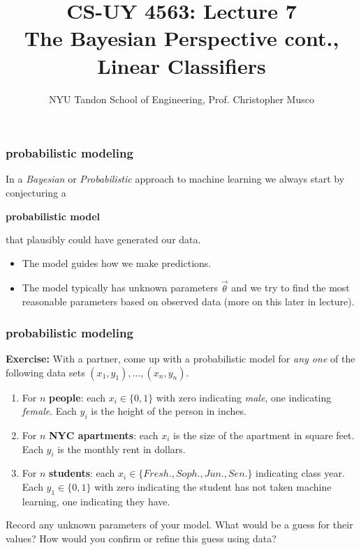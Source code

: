 \documentclass[handout,compress]{beamer}
\title{CS-UY 4563: Lecture 7 \\ The Bayesian Perspective cont., Linear Classifiers}
\author{NYU Tandon School of Engineering, Prof. Christopher Musco}
\date{}
\begin{document}
\begin{frame}
	\titlepage 
\end{frame}

\begin{frame}
	\frametitle{probabilistic modeling}
		In a \emph{Bayesian} or \emph{Probabilistic} approach to machine learning we always start by conjecturing a
		\begin{center}
			\textbf{probabilistic model}
		\end{center}
		that plausibly could have generated our data.
		
		\begin{itemize}
			\item The model guides how we make predictions.
			\item The model typically has unknown parameters $\vec{\theta}$ and we try to find the most reasonable parameters based on observed data (more on this later in lecture).
		\end{itemize}
\end{frame}

\begin{frame}
	\frametitle{probabilistic modeling}
	\textbf{Exercise:} With a partner, come up with a probabilistic model for \emph{any one} of the following data sets $(x_1, y_1), \ldots, (x_n,y_n)$.
	\begin{enumerate}
		\item For $n$ \textbf{people}: each $x_i \in \{0,1\}$ with zero indicating \emph{male}, one indicating \emph{female}. Each $y_i$ is the height of the person in inches. 
		\item For $n$ \textbf{NYC apartments}: each $x_i$ is the size of the apartment in square feet. Each $y_i$ is the monthly rent in dollars. 
		\item For $n$ \textbf{students}: each $x_i \in \{Fresh.,Soph.,Jun.,Sen.\}$ indicating class year. Each $y_1 \in \{0,1\}$ with zero indicating the student has not taken machine learning, one indicating they have.
	\end{enumerate}
	
	\vspace{-.5em}
	\begin{center}
		\alert{Record any unknown parameters of your model. What would be a guess for their values? How would you confirm or refine this guess using data?}
	\end{center}
\end{frame}
\end{document}

